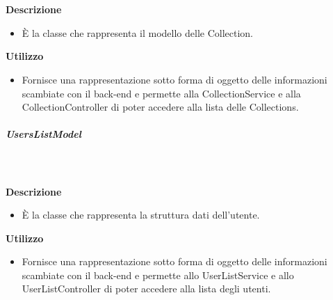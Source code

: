         \textbf{\\ \\ Descrizione} 
          \begin{itemize}
            \item[] È la classe che rappresenta il modello delle Collection.
          \end{itemize}      
        \textbf{Utilizzo}  
          \begin{itemize}
            \item[] Fornisce una rappresentazione sotto forma di oggetto delle informazioni scambiate con il back-end e permette alla CollectionService e alla CollectionController di poter accedere alla lista delle Collections.
          \end{itemize}
      \subparagraph{UsersListModel}
        
        \textbf{\\ \\ Descrizione} 
          \begin{itemize}
            \item[] È la classe che rappresenta la struttura dati dell'utente.
          \end{itemize}      
        \textbf{Utilizzo}  
          \begin{itemize}
            \item[] Fornisce una rappresentazione sotto forma di oggetto delle informazioni scambiate con il back-end e permette allo UserListService e allo UserListController di poter accedere alla lista degli utenti.
          \end{itemize}